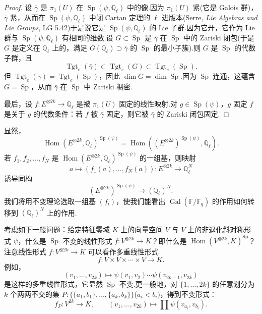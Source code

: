 \begin{proof}
设 $\bar{\gamma}$ 是 $\pi_1(U)$ 在 $\operatorname{Sp}(\psi, \mathbb{Q}_{\ell})$ 中的像.因为 $\pi_1(U)$ 紧(它是 Galois 群)，$\bar{\gamma}$ 紧，从而在 $\operatorname{Sp}(\psi, \mathbb{Q}_{\ell})$ 中闭.Cartan 定理的 $\ell$ 进版本(Serre, \emph{Lie Algebras and Lie Groups}, LG 5.42)于是说它是 $\operatorname{Sp}(\psi, \mathbb{Q}_{\ell})$ 的 Lie 子群.因为它开，它作为 Lie 群与 $\operatorname{Sp}(\psi, \mathbb{Q}_{\ell})$ 有相同的维数.设 $G \subset \operatorname{Sp}$ 是 $\bar{\gamma}$ 在 $\operatorname{Sp}$ 中的 Zariski 闭包(于是 $G$ 是定义在 $\mathbb{Q}_{\ell}$ 上的，满足 $G(\mathbb{Q}_{\ell}) \supset \bar{\gamma}$ 的 $\operatorname{Sp}$ 的最小子簇).则 $G$ 是 $\operatorname{Sp}$ 的代数子群，且
\[
\operatorname{Tgt}_e(\bar{\gamma}) \subset \operatorname{Tgt}_e(G) \subset \operatorname{Tgt}_e(\operatorname{Sp}).
\]
但 $\operatorname{Tgt}_e(\bar{\gamma}) = \operatorname{Tgt}_e(\operatorname{Sp})$，因此 $\dim G = \dim \operatorname{Sp}$.因为 $\operatorname{Sp}$ 连通，这蕴含 $G = \operatorname{Sp}$，从而 $\bar{\gamma}$ 在 $\operatorname{Sp}$ 中 Zariski 稠密.

最后，设 $f \colon E^{\otimes 2k} \to \mathbb{Q}_{\ell}$ 是被 $\pi_1(U)$ 固定的线性映射.对 $g \in \operatorname{Sp}(\psi)$，$g$ 固定 $f$ 是关于 $g$ 的代数条件：若 $f$ 被 $\bar{\gamma}$ 固定，则它被 $\bar{\gamma}$ 的 Zariski 闭包固定.
\end{proof}

显然，
\[
\operatorname{Hom}(E^{\otimes 2k}, \mathbb{Q}_{\ell})^{\operatorname{Sp}(\psi)} = \operatorname{Hom}((E^{\otimes 2k})^{\operatorname{Sp}(\psi)}, \mathbb{Q}_{\ell}).
\]
若 $f_1, f_2, \ldots, f_N$ 是 $\operatorname{Hom}(E^{\otimes 2k}, \mathbb{Q}_{\ell})^{\operatorname{Sp}(\psi)}$ 的一组基，则映射
\[
a \mapsto (f_1(a), \ldots, f_N(a)) \colon E^{\otimes 2k} \to \mathbb{Q}^{N}_{\ell}
\]
诱导同构
\[
(E^{\otimes 2k})^{\operatorname{Sp}(\psi)} \to (\mathbb{Q}_{\ell})^{N}.
\]
我们将用不变理论选取一组基 $(f_i)$，使我们能看出 $\operatorname{Gal}(\mathbb{F}/\mathbb{F}_q)$ 的作用如何转移到 $(\mathbb{Q}_{\ell})^{N}$ 上的作用.

考虑如下一般问题：给定特征零域 $K$ 上的向量空间 $V$ 与 $V$ 上的非退化斜对称形式 $\psi$，什么是 $\operatorname{Sp}$-不变的线性形式 $f \colon V^{\otimes 2k} \to K$？即什么是 $\operatorname{Hom}(V^{\otimes 2k}, K)^{\operatorname{Sp}}$？注意线性形式 $f \colon V^{\otimes 2k} \to K$ 可以看作多重线性形式
\[
f \colon V \times V \times \cdots \times V \to K.
\]
例如，
\[
(v_1, \ldots, v_{2k}) \mapsto \psi(v_1, v_2) \cdots \psi(v_{2k-1}, v_{2k})
\]
是这样的多重线性形式，它显然 $\operatorname{Sp}$-不变.更一般地，对 $\{1, \ldots, 2k\}$ 的任意划分为 $k$ 个两两不交的集 $P \colon \{\{a_1, b_1\}, \ldots, \{a_k, b_k\}\}$($a_i < b_i$)，得到不变形式：
\[
f_P \colon V^{2k} \to K, \qquad (v_1, \ldots, v_{2k}) \mapsto \prod \psi(v_{a_i}, v_{b_i}).
\]

